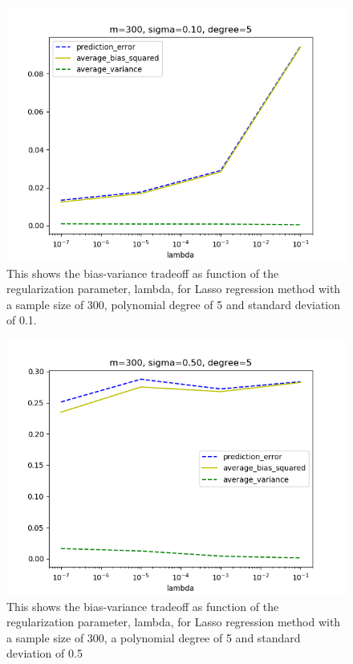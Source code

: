 \FloatBarrier
\begin{figure}[!ht]
	\centering
	\FloatBarrier
	\includegraphics[width=1\textwidth]{lasso_prediction_vs_lambda/lassoprediction_error_m300_d5_s10.png}
	
	\caption{This shows the bias-variance tradeoff as function of the regularization parameter, lambda, for Lasso regression method with a sample size of 300, polynomial degree of 5 and standard deviation of 0.1.}
	\label{fig:3}
\end{figure}
\FloatBarrier

\medskip

\FloatBarrier
\begin{figure}[!ht]
	\centering
	\FloatBarrier
	\includegraphics[width=1\textwidth]{lasso_prediction_vs_lambda/lassoprediction_error_m300_d5_s50.png}
	
	\caption{This shows the bias-variance tradeoff as function of the regularization parameter, lambda, for Lasso regression method with a sample size of 300, a polynomial degree of 5 and standard deviation of 0.5}
	\label{fig:3}
\end{figure}
\FloatBarrier

